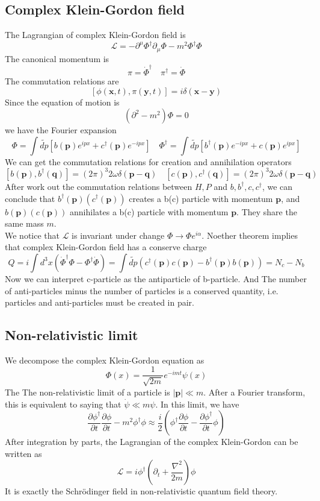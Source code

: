 \subsection{Complex Klein-Gordon field}
The Lagrangian of complex Klein-Gordon field is
\[\mathcal{L} = - \partial^{\mu}\Phi^{\dagger}\partial_{\mu}\Phi - m^2\Phi^{\dagger}\Phi\]
The canonical momentum is
\[\pi = \dot{\Phi}^{\dagger} \quad \pi^{\dagger} = \dot{\Phi}\]
The commutation relations are
\[[\phi(\bm{x},t),\pi(\bm{y},t)] = i\delta(\bm{x}-\bm{y})\]
Since the equation of motion is
\[(\partial^2-m^2)\Phi = 0\]
we have the Fourier expansion
\[\Phi = \int \widetilde{dp} [b(\bm{p})e^{ipx} + c^{\dagger}(\bm{p})e^{-ipx}] \quad \Phi^{\dagger} = \int \widetilde{dp} [b^{\dagger}(\bm{p})e^{-ipx} + c(\bm{p})e^{ipx}]\]
We can get the commutation relations for creation and annihilation operators
\[[b(\bm{p}), b^{\dagger}(\bm{q})] = (2\pi)^3 2\omega \delta(\bm{p}-\bm{q}) \quad [c(\bm{p}), c^{\dagger}(\bm{q})] = (2\pi)^3 2\omega \delta(\bm{p}-\bm{q})\]
After work out the commutation relations between $H,P$ and $b,b^{\dagger},c,c^{\dagger}$, we can conclude that $b^{\dagger}(\bm{p})(c^{\dagger}(\bm{p}))$ creates a b(c) particle with momentum $\bm{p}$, and $b(\bm{p})(c(\bm{p}))$ annihilates a b(c) particle with momentum $\bm{p}$. They share the same mass $m$.\\
We notice that $\mathcal{L}$ is invariant under change $\Phi \to \Phi e^{i\alpha}$. Noether theorem implies that complex Klein-Gordon field has a conserve charge
\[Q = i\int d^3x (\dot{\Phi}^{\dagger}\Phi - \Phi^{\dagger}\dot{\Phi}) = \int \widetilde{dp} (c^{\dagger}(\bm{p})c(\bm{p}) - b^{\dagger}(\bm{p})b(\bm{p})) = N_c - N_b\]
Now we can interpret c-particle as the antiparticle of b-particle. And The number of anti-particles minus the number of particles is a conserved quantity, i.e. particles and anti-particles must be created in pair.

\subsection{Non-relativistic limit}
We decompose the complex Klein-Gordon equation as
\[\Phi(x) = \frac{1}{\sqrt{2m}} e^{-imt}\psi(x)\]
The The non-relativistic limit of a particle is $|\bm{p}| \ll m$. After a Fourier transform, this is equivalent to saying that $\dot{\psi} \ll m\psi $. In this limit, we have
\[\frac{\partial \phi^{\dagger}}{\partial t} \frac{\partial \phi}{\partial t} - m^2 \phi^{\dagger}\phi \approx \frac{i}{2} \left( \phi^{\dagger}\frac{\partial \phi}{\partial t} - \frac{\partial \phi^{\dagger}}{\partial t} \phi\right)\]
After integration by parts, the Lagrangian of the complex Klein-Gordon can be written as
\[\mathcal{L} = i\phi^{\dagger}\left(\partial_t + \frac{\nabla^2}{2m} \right)\phi\]
It is exactly the Schr\"{o}dinger field in non-relativistic quantum field theory.
